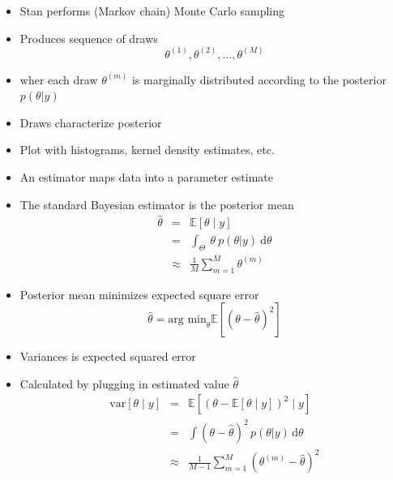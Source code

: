 \documentclass[10pt]{report}
\begin{document}

%
\begin{itemize}
\item Stan performs (Markov chain) Monte Carlo sampling
\item Produces sequence of draws
\[
\theta^{(1)}, \theta^{(2)}, \ldots, \theta^{(M)}
\]
\item wher each draw $\theta^{(m)}$ is marginally distributed according to the posterior
$p(\theta | y)$
\item Draws characterize posterior
\item Plot with histograms, kernel density estimates, etc.
\end{itemize}

%
\begin{itemize}
\item An estimator maps data into a parameter estimate
\item The standard Bayesian estimator is the posterior mean
\begin{eqnarray*}
\hat{\theta}
& = &
\mathbb{E}[\theta \mid y]
\\[6pt]
& = &
 \int_{\Theta} \ \theta \ p(\theta | y) \ \mathrm{d}\theta
\\[6pt]
& \approx &
\frac{1}{M} \sum_{m=1}^M \theta^{(m)}
\end{eqnarray*}
\item Posterior mean minimizes expected square error
\[
\hat{\theta} = \mbox{arg min}_{\theta} \mathbb{E}[(\theta -
\hat{\theta})^2]
\]
\end{itemize}


%
\begin{itemize}
\item Variances is expected squared error
\item Calculated by plugging in estimated value $\hat{\theta}$
\begin{eqnarray*}
\mathrm{var}[\theta \mid y]
& = & \mathbb{E}[(\theta - \mathbb{E}[\theta \mid y])^2 \mid y]
\\[6pt]
& = & \int (\theta - \hat{\theta})^2 \, p(\theta | y) \, \mathrm{d}\theta
\\[6pt]
& \approx &
\frac{1}{M - 1} \sum_{m=1}^M (\theta^{(m)} - \hat{\theta})^2
\end{eqnarray*}
\end{itemize}
\end{document}
